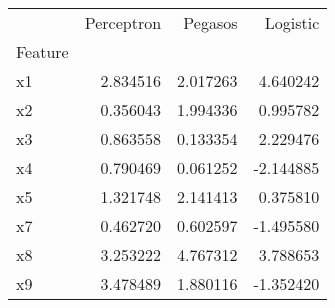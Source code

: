 \begin{tabular}{lrrr}
\toprule
 & Perceptron & Pegasos & Logistic \\
Feature &  &  &  \\
\midrule
x1 & 2.834516 & 2.017263 & 4.640242 \\
x2 & 0.356043 & 1.994336 & 0.995782 \\
x3 & 0.863558 & 0.133354 & 2.229476 \\
x4 & 0.790469 & 0.061252 & -2.144885 \\
x5 & 1.321748 & 2.141413 & 0.375810 \\
x7 & 0.462720 & 0.602597 & -1.495580 \\
x8 & 3.253222 & 4.767312 & 3.788653 \\
x9 & 3.478489 & 1.880116 & -1.352420 \\
\bottomrule
\end{tabular}
